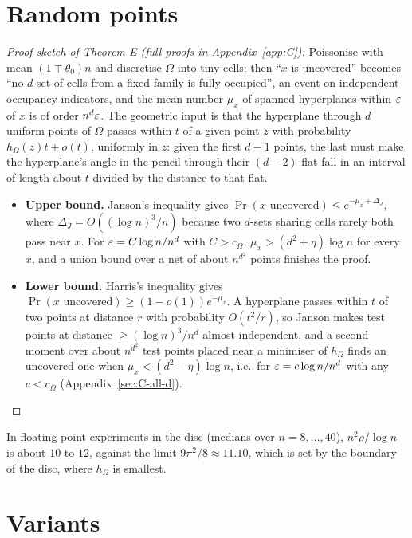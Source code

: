 \documentclass[11pt]{article}
\begin{document}
\section{Random points}\label{sec:random}

\begin{proof}[Proof sketch of Theorem E (full proofs in Appendix~\ref{app:C})]
Poissonise with mean $(1\mp\theta_0)n$ and discretise $\Omega$ into tiny cells: then ``$x$ is uncovered''
becomes ``no $d$-set of cells from a fixed family is fully occupied'', an event on independent occupancy
indicators, and the mean number $\mu_x$ of spanned hyperplanes within $\varepsilon$ of $x$ is of order $n^d\varepsilon$. The
geometric input is that the hyperplane through $d$ uniform points of $\Omega$ passes within $t$ of a given
point $z$ with probability $h_\Omega(z)t+o(t)$, uniformly in $z$: given the first $d-1$ points, the last must make the
hyperplane's angle in the pencil through their $(d-2)$-flat fall in an interval of length about $t$
divided by the distance to that flat.
\begin{itemize}
\item \textbf{Upper bound.} Janson's inequality \cite{Janson} gives $\Pr(x\text{ uncovered})\le e^{-\mu_x+\Delta_J}$,
where $\Delta_J=O((\log n)^3/n)$ because two $d$-sets sharing cells rarely both pass near $x$. For
$\varepsilon=C\log n/n^d$ with $C>c_\Omega$, $\mu_x>(d^2+\eta)\log n$ for every $x$, and a union bound over a net of
about $n^{d^2}$ points finishes the proof.
\item \textbf{Lower bound.} Harris's inequality \cite{Harris} gives $\Pr(x\text{ uncovered})\ge(1-o(1))e^{-\mu_x}$. A
hyperplane passes within $t$ of two points at distance $r$ with probability $O(t^2/r)$, so Janson makes test
points at distance $\ge(\log n)^3/n^d$ almost independent, and a second moment over about $n^{d^2}$ test points
placed near a minimiser of $h_\Omega$ finds an uncovered one when $\mu_x<(d^2-\eta)\log n$, i.e.\ for
$\varepsilon=c\log n/n^d$ with any $c<c_\Omega$ (Appendix~\ref{sec:C-all-d}).\qedhere
\end{itemize}
\end{proof}

In floating-point experiments in the disc (medians over $n=8,\dots,40$), $n^2\rho/\log n$ is about $10$ to $12$,
against the limit $9\pi^2/8\approx11.10$, which is set by the boundary of the disc, where $h_\Omega$ is smallest.

\section{Variants}\label{sec:variants}
\end{document}
